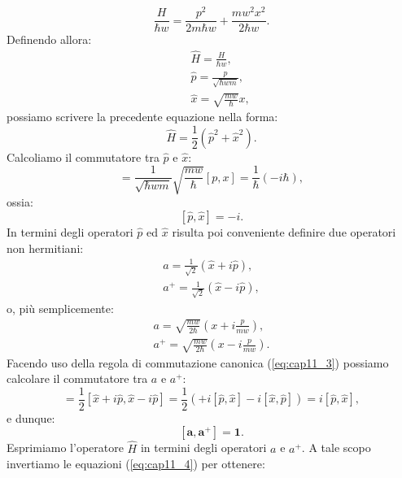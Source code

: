 \documentclass[a4paper,12pt,oneside]{book}
\begin{document}
\begin{equation} \label{eq:cap11_2}
\frac{H}{\hbar w}=\frac{p^2}{2m\hbar w}+\frac{mw^2x^2}{2\hbar w}.
\end{equation}
Definendo allora:
\begin{eqnarray}  
	& &\hat{H}=\frac{H}{\hbar w},  \\
	& &\hat{p}=\frac{p}{\sqrt{\hbar w m}},  \\
	& &\hat{x}= \sqrt{\frac{mw}{\hbar}}x,
\end{eqnarray}
possiamo scrivere la precedente equazione nella forma:
\begin{equation}
\hat{H}=\frac{1}{2} (\hat{p}^2+\hat{x}^2).
\end{equation}
Calcoliamo il commutatore tra $\hat{p}$ e $\hat{x}$:
\begin{equation}
[\hat{p},\hat{x}]= \frac{1}{\sqrt{\hbar w m}} \sqrt{\frac{mw}{\hbar}} [p,x]=\frac{1}{\hbar}(-i\hbar),
\end{equation}
ossia:
\begin{equation}  \label{eq:cap11_3}
[\hat{p},\hat{x}]=-i.
\end{equation}
In termini degli operatori $\hat{p}$ ed $\hat{x}$ risulta poi conveniente definire due operatori non hermitiani:
\begin{equation} \label{eq:cap11_4}
\begin{split} 
	a=\frac{1}{\sqrt{2} } (\hat{x}+i\hat{p}), \\
	a^+=\frac{1}{\sqrt{2} } (\hat{x}-i\hat{p}),
\end{split} \end{equation}
o, più semplicemente:
\begin{equation} 
\begin{split}
	a=\sqrt{\frac{mw}{2\hbar}}(x+i \frac{p}{mw}), \\
	a^+=\sqrt{\frac{mw}{2\hbar}}(x-i \frac{p}{mw}).
\end{split}
\end{equation}
Facendo uso della regola di commutazione canonica (\ref{eq:cap11_3}) possiamo calcolare il commutatore tra $a$ e $a^+$:
\begin{equation}
[a,a^+]=\frac{1}{2} [\hat{x}+i\hat{p},\hat{x}-i\hat{p}]=\frac{1}{2}  \left( +i[\hat{p},\hat{x}]-i[\hat{x},\hat{p}]   \right ) = i[\hat{p},\hat{x}],
\end{equation}
e dunque:
\begin{equation}
\mathbf{[a,a^+]=1}.
\end{equation}
Esprimiamo l'operatore $\hat{H}$ in termini degli operatori $a$ e $a^+$. A tale scopo invertiamo le equazioni (\ref{eq:cap11_4}) per ottenere:
\end{document}
